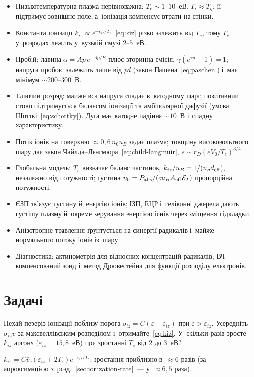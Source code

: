 \begin{Summary}
\begin{itemize}
	\item Низькотемпературна плазма нерівноважна: $T_e\sim1$--$10$~еВ, $T_i\approx T_g$; її підтримує зовнішнє поле,
	а~іонізація компенсує втрати на стінки.
	\item Константа іонізації $k_{iz}\propto e^{-\varepsilon_{iz}/T_e}$~\eqref{eq:kiz} різко залежить від $T_e$,
	тому $T_e$ у~розрядах лежить у~вузькій смузі $2$--$5$~еВ.
	\item Пробій: лавина $\alpha=Ap\,e^{-Bp/E}$ плюс вторинна емісія, $\gamma(e^{\alpha d}-1)=1$; напруга пробою
	залежить лише від $pd$ (закон Пашена~\eqref{eq:paschen}) і~має мінімум $\sim200$--$300$~В.
	\item Тліючий розряд: майже вся напруга спадає в~катодному шарі; позитивний стовп підтримується
	балансом іонізації та амбіполярної дифузії (умова Шотткі~\eqref{eq:schottky}). Дуга має катодне
	падіння $\sim10$~В і~спадну характеристику.
	\item Потік іонів на поверхню $\approx0{,}6\,n_0u_B$ задає плазма; товщину високовольтного шару
	дає закон Чайлда--Ленгмюра~\eqref{eq:child-langmuir}, $s\sim r_D(eV_0/T_e)^{3/4}$.
	\item Глобальна модель: $T_e$ визначає баланс частинок, $k_{iz}/u_B=1/(n_gd_{\rm eff})$, незалежно від
	потужності; густина $n_0=P_{\rm abs}/(eu_BA_{\rm eff}\mathcal E_T)$ пропорційна потужності.
	\item ЄЗП зв'язує густину й~енергію іонів; ІЗП, ЕЦР і~геліконні джерела дають густішу плазму й~окреме
	керування енергією іонів через зміщення підкладки.
	\item Анізотропне травлення ґрунтується на синергії радикалів і~майже нормального потоку іонів із~шару.
	\item Діагностика: актинометрія для відносних концентрацій радикалів, ВЧ-компенсований зонд і~метод
	Дрювестейна для функції розподілу електронів.
\end{itemize}
\end{Summary}

\section*{Задачі}

\begin{problem}\label{prb:IonizationRate}
	Нехай переріз іонізації поблизу порога $\sigma_{iz}=C(\varepsilon-\varepsilon_{iz})$ при $\varepsilon>\varepsilon_{iz}$.
	Усередніть $\sigma_{iz}v$ за максвеллівським розподілом і~отримайте~\eqref{eq:kiz}. У~скільки разів зросте
	$k_{iz}$ аргону ($\varepsilon_{iz}=15{,}8$~еВ) при зростанні $T_e$ від $2$ до $3$~еВ?
	\begin{solution}
		$k_{iz}=C\bar v_e(\varepsilon_{iz}+2T_e)e^{-\varepsilon_{iz}/T_e}$; зростання приблизно в~$\approx6$ разів
	(за апроксимацією з~розд.~\ref{sec:ionization-rate}~--- у~$\approx6{,}5$ раза).
	\end{solution}
\end{problem}

